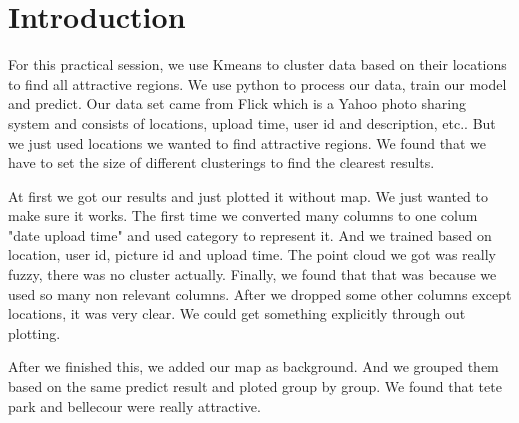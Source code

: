 \documentclass{article}
\begin{document}
\section*{Introduction}
For this practical session, we use Kmeans to cluster data based on their locations to find all attractive regions.
%
We use python to process our data, train our model and predict.
%
Our data set came from Flick which is a Yahoo photo sharing system and consists of locations, upload time, user id and description, etc.. 
%
But we just used locations we wanted to find attractive regions.
%
We found that we have to set the size of different clusterings to find the clearest results.

\par

At first we got our results and just plotted it without map. We just wanted to make sure it works.
%
The first time we converted many columns to one colum "date upload time" and used category to represent it.
%
And we trained based on location, user id, picture id and upload time.  
%
The point cloud we got was really fuzzy, there was no cluster actually.
%
Finally, we found that that was because we used so many non relevant columns.
%
After we dropped some other columns except locations, it was very clear.
%
We could get something explicitly through out plotting.

\par
After we finished this, we added our map as background.
%
And we grouped them based on the same predict result and ploted group by group.
%
We found that tete park and bellecour were really attractive.
 
\end{document}
